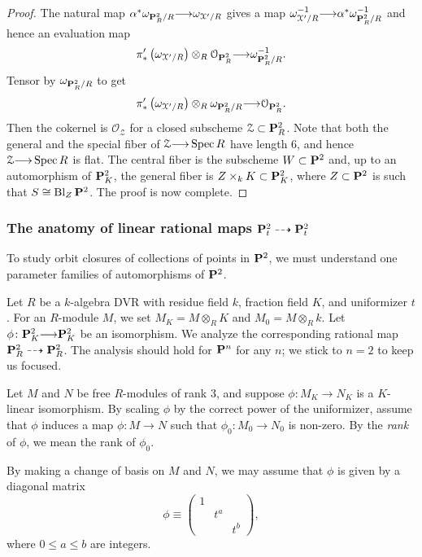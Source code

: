 \documentclass[12pt,reqno]{amsart}
\renewcommand{\k}{k}
\DeclareMathOperator{\Bl}{Bl}
\renewcommand{\to}{{\longrightarrow}}
\numberwithin{equation}{section}
\renewcommand{\O}{\mathcal O}
\begin{document}
\begin{proof}
  The natural map $\alpha^* \omega_{\P^2_R/R} \to \omega_{\mathcal X'/R}$ gives a map $\omega^{-1}_{\mathcal X'/R} \to \alpha^* \omega^{-1}_{\P^2_R/R}$ and hence an evaluation map
  \[ \pi'_* \left(\omega_{\mathcal X'/R}\right) \otimes_R \O_{\P^2_R} \to \omega_{\P^2_R/R}^{-1}.\]
  Tensor by $\omega_{\P^2_R/R}$ to get
  \[ \pi'_* \left(\omega_{\mathcal X'/R}\right) \otimes_R \omega_{\P^2_R/R} \to \O_{\P^2_R}.\]
  Then the cokernel is $\O_{\mathcal Z}$ for a closed subscheme $\mathcal Z \subset \P^2_R$.
  Note that both the general and the special fiber of $\mathcal Z \to \spec R$ have length 6, and hence $\mathcal Z \to \spec R$ is flat.
  The central fiber is the subscheme $W \subset \P^2$ and, up to an automorphism of $\P^2_K$, the general fiber is $Z \times_k K \subset \P^2_K$, where $Z \subset \P^2$ is such that $S \cong \Bl_Z \P^2$.
  The proof is now complete.
\end{proof}

\subsubsection{The anatomy of linear rational maps $\P_t^2 \dashrightarrow \P_t^2$}\label{sec:ratmap}
To study orbit closures of collections of points in $\P^2$, we must understand one parameter families of automorphisms of $\P^2$.

Let $R$ be a $\k$-algebra DVR with residue field $\k$, fraction field $K$, and uniformizer $t$.
For an $R$-module $M$, we set $M_K = M \otimes_R K$ and $M_0 = M \otimes_R \k$.
Let $\phi \colon \P^2_K \to \P^2_K$ be an isomorphism.
We analyze the corresponding rational map $\P^2_R \dashrightarrow \P^2_R$.
The analysis should hold for $\P^n$ for any $n$; we stick to $n = 2$ to keep us focused.

Let $M$ and $N$ be free $R$-modules of rank 3, and suppose $\phi \colon M_K \to N_K$ is a $K$-linear isomorphism.
By scaling $\phi$ by the correct power of the uniformizer, assume that $\phi$ induces a map $\phi \colon M \to N$ such that $\phi_0 \colon M_0 \to N_0$ is non-zero.
By the \emph{rank} of $\phi$, we mean the rank of $\phi_0$.

By making a change of basis on $M$ and $N$, we may assume that $\phi$ is given by a diagonal matrix
\[
  \phi \equiv
  \begin{pmatrix}
    1 & & \\
     & t^a & \\
    & & t^b
  \end{pmatrix},
\]
where $0 \leq a \leq b$ are integers.
\end{document}
